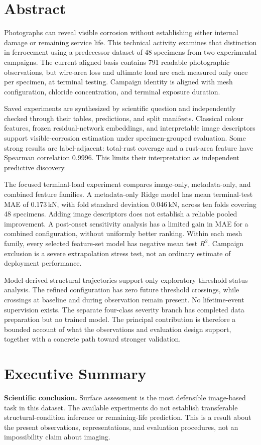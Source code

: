 \chapter*{Abstract}
Photographs can reveal visible corrosion without establishing either internal damage or remaining service life. This technical activity examines that distinction in ferrocement using a predecessor dataset of 48 specimens from two experimental campaigns. The current aligned basis contains 791 readable photographic observations, but wire-area loss and ultimate load are each measured only once per specimen, at terminal testing. Campaign identity is aligned with mesh configuration, chloride concentration, and terminal exposure duration.

Saved experiments are synthesized by scientific question and independently checked through their tables, predictions, and split manifests. Classical colour features, frozen residual-network embeddings, and interpretable image descriptors support visible-corrosion estimation under specimen-grouped evaluation. Some strong results are label-adjacent: total-rust coverage and a rust-area feature have Spearman correlation 0.9996. This limits their interpretation as independent predictive discovery.

The focused terminal-load experiment compares image-only, metadata-only, and combined feature families. A metadata-only Ridge model has mean terminal-test MAE of 0.173\,kN, with fold standard deviation 0.046\,kN, across ten folds covering 48 specimens. Adding image descriptors does not establish a reliable pooled improvement. A post-onset sensitivity analysis has a limited gain in MAE for a combined configuration, without uniformly better ranking. Within each mesh family, every selected feature-set model has negative mean test $R^2$. Campaign exclusion is a severe extrapolation stress test, not an ordinary estimate of deployment performance.

Model-derived structural trajectories support only exploratory threshold-status analysis. The refined configuration has zero future threshold crossings, while crossings at baseline and during observation remain present. No lifetime-event supervision exists. The separate four-class severity branch has completed data preparation but no trained model. The principal contribution is therefore a bounded account of what the observations and evaluation design support, together with a concrete path toward stronger validation.

\chapter*{Executive Summary}
\textbf{Scientific conclusion.} Surface assessment is the most defensible image-based task in this dataset. The available experiments do not establish transferable structural-condition inference or remaining-life prediction. This is a result about the present observations, representations, and evaluation procedures, not an impossibility claim about imaging.

